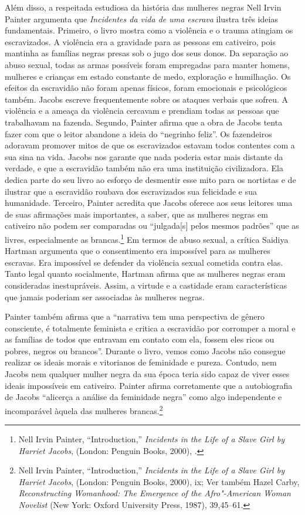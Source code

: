Além disso, a respeitada estudiosa da história das mulheres negras Nell
Irvin Painter argumenta que \emph{Incidentes da vida de uma escrava}
ilustra três ideias fundamentais. Primeiro, o livro mostra como a
violência e o trauma atingiam os escravizados. A violência era a
gravidade para as pessoas em cativeiro, pois
mantinha as famílias negras presas sob o jugo dos seus donos. Da
separação ao abuso sexual, todas as armas possíveis foram empregadas
para manter homens, mulheres e crianças em estado constante de medo,
exploração e humilhação. Os efeitos da escravidão não foram apenas
físicos, foram emocionais e psicológicos também. Jacobs escreve
frequentemente sobre os ataques verbais que sofreu. A violência e a
ameaça da violência cercavam e prendiam todas as pessoas que trabalhavam
na fazenda. Segundo, Painter afirma que a obra de Jacobs tenta fazer com
que o leitor abandone a ideia do ``negrinho feliz''. Os fazendeiros
adoravam promover mitos de que os escravizados estavam todos contentes com a
sua sina na vida. Jacobs nos garante que nada poderia estar mais
distante da verdade, e que a escravidão também não era uma instituição
civilizadora. Ela dedica parte do seu livro ao esforço de desmentir esse
mito para os nortistas e de ilustrar que a escravidão roubava dos
escravizados sua felicidade e sua humanidade. Terceiro, Painter acredita
que Jacobs oferece aos seus leitores uma de suas afirmações mais
importantes, a saber, que as mulheres negras em cativeiro não podem ser
comparadas ou ``julgada{[}s{]} pelos mesmos padrões'' que as livres,
especialmente as brancas.\footnote{Nell Irvin Painter, ``Introduction,''
  \emph{Incidents in the Life of a Slave Girl by Harriet Jacobs},
  (London: Penguin Books, 2000), .} Em termos de abuso sexual, a
crítica Saidiya Hartman argumenta que o consentimento era impossível
para as mulheres escravas. Era impossível se defender da violência
sexual cometida contra elas. Tanto legal quanto socialmente, Hartman
afirma que as mulheres negras eram consideradas inestupráveis. Assim, a
virtude e a castidade eram características que jamais poderiam ser
associadas às mulheres negras.

Painter também afirma que a ``narrativa tem uma perspectiva de gênero
consciente, é totalmente feminista e critica a escravidão por corromper
a moral e as famílias de todos que entravam em contato com ela, fossem
eles ricos ou pobres, negros ou brancos''. Durante o livro, vemos como
Jacobs não consegue realizar os ideais morais e vitorianos de feminidade
e pureza. Contudo, nem Jacobs nem qualquer mulher negra da sua época
teria sido capaz de viver esses ideais impossíveis em cativeiro. Painter
afirma corretamente que a autobiografia de Jacobs ``alicerça a análise
da feminidade negra'' como algo independente e incomparável àquela das
mulheres brancas.\footnote{Nell Irvin Painter, ``Introduction,''
  \emph{Incidents in the Life of a Slave Girl by Harriet Jacobs},
  (London: Penguin Books, 2000), ix; Ver também Hazel Carby,
  \emph{Reconstructing Womanhood: The Emergence of the Afro"-American
  Woman Novelist} (New York: Oxford University Press, 1987), 39,45--61.}

